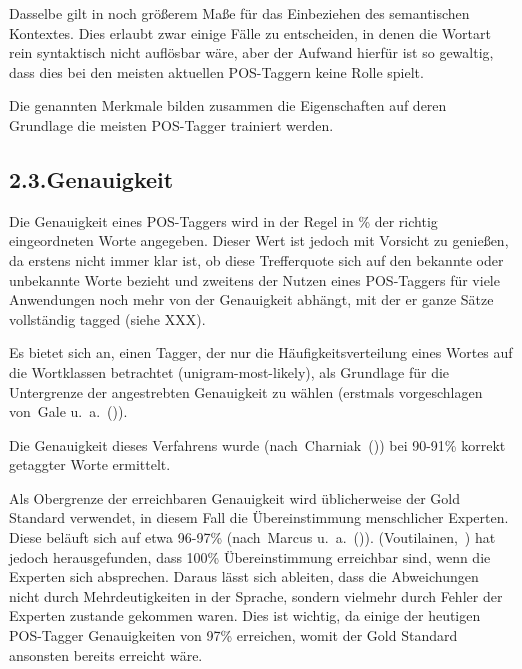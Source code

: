 \documentclass{article}
\begin{document}
Dasselbe gilt in noch größerem Maße für das Einbeziehen des semantischen Kontextes. Dies erlaubt zwar einige Fälle zu entscheiden, in denen die Wortart rein syntaktisch nicht auflösbar wäre, aber der Aufwand hierfür ist so gewaltig, dass dies bei den meisten aktuellen POS-Taggern keine Rolle spielt.%

Die genannten Merkmale bilden zusammen die Eigenschaften auf deren Grundlage die meisten POS-Tagger trainiert werden.%

\subsection{2.3.\hspace*{0.5em}Genauigkeit}\label{sec-genauigkeit}%

\noindent{}Die Genauigkeit eines POS-Taggers wird in der Regel in \% der richtig eingeordneten Worte angegeben. Dieser Wert ist jedoch mit Vorsicht zu genießen, da erstens nicht immer klar ist, ob diese Trefferquote sich auf den bekannte oder unbekannte Worte bezieht und zweitens der Nutzen eines POS-Taggers für viele Anwendungen noch mehr von der Genauigkeit abhängt, mit der er ganze Sätze vollständig tagged (siehe XXX).%

Es bietet sich an, einen Tagger, der nur die Häufigkeitsverteilung eines Wortes auf die Wortklassen betrachtet (unigram-most-likely), als Grundlage für die Untergrenze der angestrebten Genauigkeit zu wählen (erstmals vorgeschlagen von~Gale u. a.~()).%

Die Genauigkeit dieses Verfahrens wurde (nach~Charniak~()) bei 90-91\% korrekt getaggter Worte ermittelt.%

Als Obergrenze der erreichbaren Genauigkeit wird üblicherweise der Gold Standard verwendet, in diesem Fall die Übereinstimmung menschlicher Experten. Diese beläuft sich auf etwa 96-97\% (nach~Marcus u. a.~()).
(Voutilainen,~) hat jedoch herausgefunden, dass 100\% Übereinstimmung erreichbar sind, wenn die Experten sich absprechen. Daraus lässt sich ableiten, dass die Abweichungen nicht durch Mehrdeutigkeiten in der Sprache, sondern vielmehr durch Fehler der Experten zustande gekommen waren.
Dies ist wichtig, da einige der heutigen POS-Tagger Genauigkeiten von 97\% erreichen, womit der Gold Standard ansonsten bereits erreicht wäre.%
\end{document}
